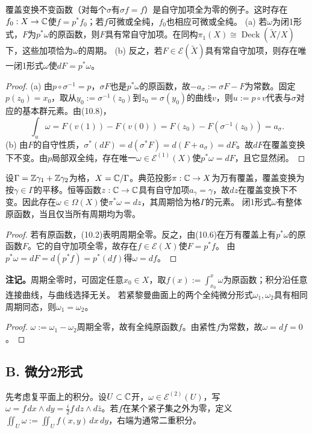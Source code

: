 覆盖变换不变函数（对每个$\sigma$有$\sigma f=f$）是自守加项全为零的例子。这时存在$f_0:X\to\mathbb C$使$f=p^*f_0$；若$f$可微或全纯，$f_0$也相应可微或全纯。
(a) 若$\omega$为闭1形式，$F$为$p^*\omega$的原函数，则$F$具有常自守加项。在同构$\pi_1(X)\cong\operatorname{Deck}(\widetilde X/X)$下，这些加项恰为$\omega$的周期。
(b) 反之，若$F\in\mathcal E(\widetilde X)$具有常自守加项，则存在唯一闭1形式$\omega$使$dF=p^*\omega$。
\begin{proof}
(a) 由$p\circ\sigma^{-1}=p$，$\sigma F$也是$p^*\omega$的原函数，故$-a_\sigma:=\sigma F-F$为常数。固定$p(z_0)=x_0$，取从$y_0:=\sigma^{-1}(z_0)$到$z_0=\sigma(y_0)$的曲线$v$，则$u:=p\circ v$代表与$\sigma$对应的基本群元素。由(10.8)，
\[
\int_u\omega=F(v(1))-F(v(0))=F(z_0)-F(\sigma^{-1}(z_0))=a_\sigma.
\]
(b) 由$F$的自守性质，$\sigma^*(dF)=d(\sigma^*F)=d(F+a_\sigma)=dF$。故$dF$在覆盖变换下不变。由$p$局部双全纯，存在唯一$\omega\in\mathcal E^{(1)}(X)$使$p^*\omega=dF$，且它显然闭。
\end{proof}
设$\Gamma=\mathbb Z\gamma_1+\mathbb Z\gamma_2$为格，$X=\mathbb C/\Gamma$。典范投影$\pi:\mathbb C\to X$为万有覆盖，覆盖变换为按$\gamma\in\Gamma$的平移。恒等函数$z:\mathbb C\to\mathbb C$具有自守加项$a_\gamma=\gamma$，故$dz$在覆盖变换下不变。因此存在$\omega\in\Omega(X)$使$\pi^*\omega=dz$，其周期恰为格$\Gamma$的元素。
闭1形式$\omega$有整体原函数，当且仅当所有周期均为零。
\begin{proof}
若有原函数，(10.2)表明周期全零。反之，由(10.6)在万有覆盖上有$p^*\omega$的原函数$F$。它的自守加项全零，故存在$f\in\mathcal E(X)$使$F=p^*f$。
由$p^*\omega=dF=d(p^*f)=p^*(df)$得$\omega=df$。
\end{proof}
\textbf{注记。}周期全零时，可固定任意$x_0\in X$，取$f(x):=\int_{x_0}^x\omega$为原函数；积分沿任意连接曲线，与曲线选择无关。
若紧黎曼曲面上的两个全纯微分形式$\omega_1,\omega_2$具有相同周期同态，则$\omega_1=\omega_2$。
\begin{proof}
$\omega:=\omega_1-\omega_2$周期全零，故有全纯原函数$f$。由紧性$f$为常数，故$\omega=df=0$。
\end{proof}
\subsection*{B. 微分2形式}
先考虑复平面上的积分。设$U\subset\mathbb C$开，$\omega\in\mathcal E^{(2)}(U)$，写$\omega=f\,dx\wedge dy=\frac i2f\,dz\wedge d\bar z$。若$f$在某个紧子集之外为零，定义$\iint_U\omega:=\iint_Uf(x,y)\,dx\,dy$，右端为通常二重积分。

